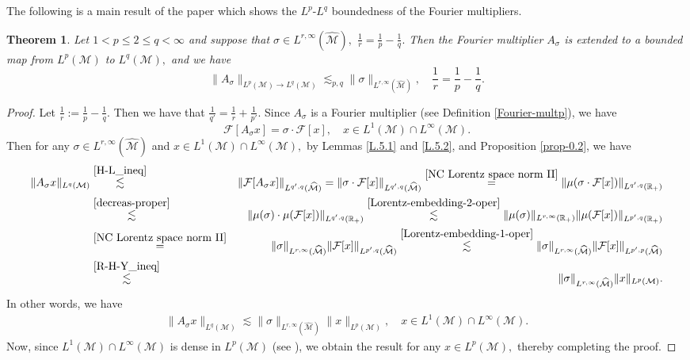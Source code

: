 \documentclass[a4paper,12pt]{amsart}
\newtheorem{thm}{Theorem}[section]
\numberwithin{equation}{section}
\theoremstyle{definition}
\begin{document}
The following is a main result of the paper which shows the $L^p$-$L^q$ boundedness of the Fourier multipliers.
\begin{thm}\label{Hormander-thm} Let  $1<p\leq2\leq q<\infty$ and suppose that $\sigma\in L^{r,\infty}(\widehat{\mathcal{M}}),$ $\frac{1}{r}= \frac{1}{p} - \frac{1}{q}.$ Then the Fourier multiplier $A_\sigma$ is extended to a bounded map from $L^p(\mathcal{M})$ to  $L^q(\mathcal{M}),$ and we have
$$
\|A_\sigma\|_{L^p(\mathcal{M}) \rightarrow L^q(\mathcal{M})}\lesssim_{p,q}  \|\sigma\|_{L^{r,\infty}(\widehat{\mathcal{M}})}, \quad \frac{1}{r}= \frac{1}{p} - \frac{1}{q}.$$ 
\end{thm}
\begin{proof} Let $\frac{1}{r}:=\frac{1}{p} - \frac{1}{q}.$ Then we have that $\frac{1}{q'}=\frac{1}{r} +\frac{1}{p'}.$  Since $A_\sigma$ is a Fourier multiplier (see Definition \ref{Fourier-multp}), we have
$$\mathcal{F}[A_\sigma x]=\sigma\cdot\mathcal{F}[x], \quad x\in L^1(\mathcal{M})\cap L^{\infty}(\mathcal{M}).$$
Then for any $\sigma\in L^{r,\infty}(\widehat{\mathcal{M}})$ and
$x\in L^1(\mathcal{M})\cap L^{\infty}(\mathcal{M}),$ by Lemmas \ref{L.5.1} and \ref{L.5.2}, and Proposition \ref{prop-0.2}, we have
\begin{eqnarray*}\|A_\sigma x\|_{L^q(\mathcal{M})}&\overset{\eqref{H-L_ineq}}{\lesssim}&\|\mathcal{F}[A_\sigma x]\|_{L^{q',q}(\widehat{\mathcal{M}})}=\|\sigma \cdot \mathcal{F}[x]\|_{L^{q',q}(\widehat{\mathcal{M}})}\overset{\eqref{NC Lorentz space norm II}}{=}\|\mu(\sigma\cdot\mathcal{F}[x])\|_{L^{q',q}(\mathbb{R}_+)}\\
&\overset{\eqref{decreas-proper}}{\lesssim}&\|\mu(\sigma)\cdot\mu(\mathcal{F}[x])\|_{L^{q',q}(\mathbb{R}_+)}\overset{\eqref{Lorentz-embedding-2-oper}}{\lesssim}\|\mu(\sigma)\|_{L^{r,\infty}(\mathbb{R}_+)}\|\mu(\mathcal{F}[x])\|_{L^{p',q}(\mathbb{R}_+)}\\
&\overset{\eqref{NC Lorentz space norm II}}{=}&\|\sigma\|_{L^{r,\infty}(\widehat{\mathcal{M}})}\|\mathcal{F}[x]\|_{L^{p',q}(\widehat{\mathcal{M}})}\overset{\eqref{Lorentz-embedding-1-oper}}{\lesssim}\|\sigma\|_{L^{r,\infty}(\widehat{\mathcal{M}})}\|\mathcal{F}[x]\|_{L^{p',p}(\widehat{\mathcal{M}})}\\
&\overset{\eqref{R-H-Y_ineq}}{\lesssim}&\|\sigma\|_{L^{r,\infty}(\widehat{\mathcal{M}})}\|x\|_{L^{p}(\mathcal{M})}.
\end{eqnarray*}
In other words, we have 
\begin{eqnarray*}\|A_\sigma x\|_{L^q(\mathcal{M})}\lesssim\|\sigma\|_{L^{r,\infty}(\widehat{\mathcal{M}})}\|x\|_{L^{p}(\mathcal{M})},\quad x\in L^1(\mathcal{M})\cap L^{\infty}(\mathcal{M}).
\end{eqnarray*}
Now, since $L^1(\mathcal{M})\cap L^{\infty}(\mathcal{M})$ is dense in $L^p(\mathcal{M})$ (see \cite[Proposition 3.10.2 (i) and Section 3.10, pp. 202-205]{DPS}), we obtain the result for any $x\in L^p(\mathcal{M}),$
thereby completing the proof.
\end{proof}
\end{document}
